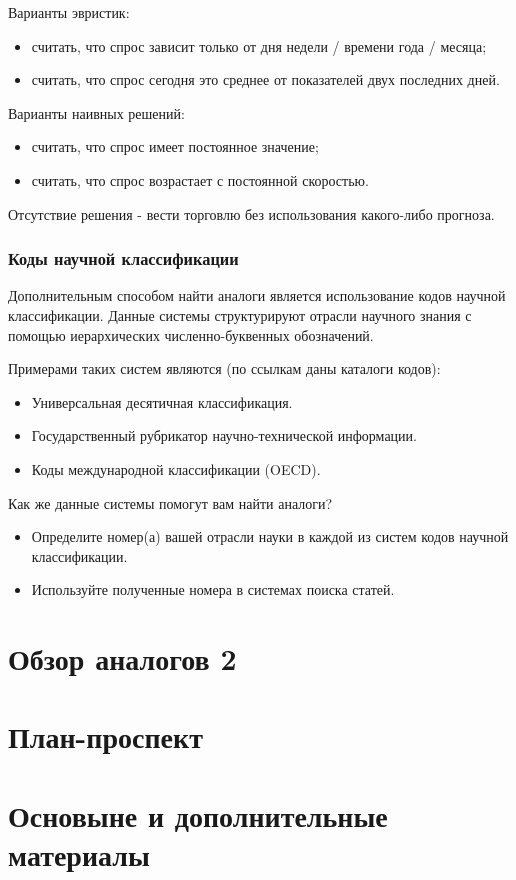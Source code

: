 \documentclass{report}
\begin{document}
Варианты эвристик:

\begin{itemize}
	\item считать, что спрос зависит только от дня недели / времени года / месяца;
	\item считать, что спрос сегодня это среднее от показателей двух последних дней.
\end{itemize}

Варианты наивных решений:

\begin{itemize}
	\item считать, что спрос имеет постоянное значение;
	\item считать, что спрос возрастает с постоянной скоростью.
\end{itemize}
Отсутствие решения - вести торговлю без использования какого-либо прогноза.

\subsubsection{Коды научной классификации}
Дополнительным способом найти аналоги является использование кодов научной классификации. Данные системы структурируют отрасли научного знания с помощью иерархических численно-буквенных обозначений.

Примерами таких систем являются (по ссылкам даны каталоги кодов):
\begin{itemize}
	\item Универсальная десятичная классификация.
	\item Государственный рубрикатор научно-технической информации.
	\item Коды международной классификации (OECD).
\end{itemize}
Как же данные системы помогут вам найти аналоги?

\begin{itemize}
	\item Определите номер(а) вашей отрасли науки в каждой из систем кодов научной классификации.
	\item Используйте полученные номера в системах поиска статей.
\end{itemize}





\section{Обзор аналогов 2}
\section{План-проспект}
\section{Основыне и дополнительные материалы}
\end{document}
